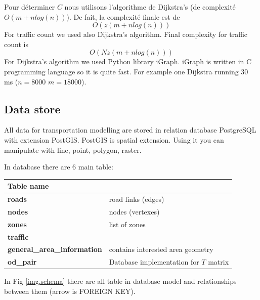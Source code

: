 
Pour déterminer $C$ nous utilisons l'algorithme de Dijkstra's (de complexité $O(m +n log(n) )$). De fait, la complexité finale est de
$$O(z (m + n log(n)))$$
For traffic count we used also Dijkstra's algorithm. Final complexity for traffic count is 
$$O(N z (m + n log(n)))$$
For Dijkstra's algorithm we used Python library iGraph. iGraph is written in C programming language so it is quite fast. For example one Dijkstra running 30 ms ($n = 8000$ $m = 18000$).

\subsection{Data store}
All data for transportation modelling are stored in relation database PostgreSQL with extension PostGIS. PostGIS is spatial extension. Using it you can manipulate with line, point, polygon, raster.

In database there are 6 main table:

\begin{tabular}{|l|l|}
\hline
Table name & \\
\hline
\hline
\textbf{roads} & road links (edges)\\
\textbf{nodes} & nodes (vertexes)\\
\textbf{zones} & list of zones\\ 
\textbf{traffic} & \\
\textbf{general\_area\_information} & contains interested area geometry\\
\textbf{od\_pair} & Database implementation for $T$ matrix\\
\hline
\end{tabular}

In Fig \ref{img.schema} there are all table in database model and relationships between them (arrow is FOREIGN KEY).


